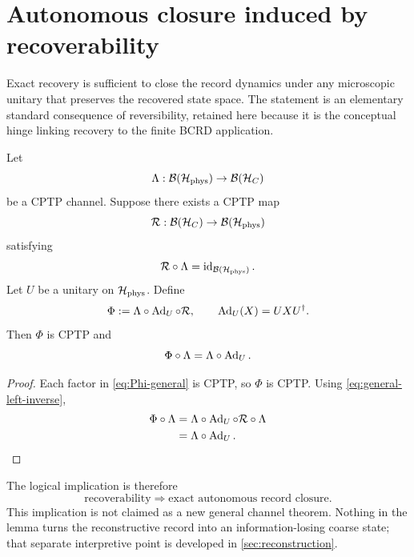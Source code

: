 \section{Autonomous closure induced by recoverability}
\label{sec:closure}

Exact recovery is sufficient to close the record dynamics under any microscopic unitary that preserves the recovered state space.  The statement is an elementary standard consequence of reversibility, retained here because it is the conceptual hinge linking recovery to the finite BCRD application.

\begin{lemma}
\label{lem:left-inverse-closure}
Let
\begin{equation}
  \Lambda:\mathcal B(\mathcal H_{\mathrm{phys}})\to\mathcal B(\mathcal H_C)
\end{equation}
be a CPTP channel.  Suppose there exists a CPTP map
\begin{equation}
  \mathcal R:\mathcal B(\mathcal H_C)\to\mathcal B(\mathcal H_{\mathrm{phys}})
\end{equation}
satisfying
\begin{equation}
  \mathcal R\circ\Lambda=\operatorname{id}_{\mathcal B(\mathcal H_{\mathrm{phys}})}.
  \label{eq:general-left-inverse}
\end{equation}
Let $U$ be a unitary on $\mathcal H_{\mathrm{phys}}$.  Define
\begin{equation}
  \Phi:=\Lambda\circ\operatorname{Ad}_U\circ\mathcal R,
  \qquad
  \operatorname{Ad}_U(X)=UXU^\dagger.
  \label{eq:Phi-general}
\end{equation}
Then $\Phi$ is CPTP and
\begin{equation}
  \Phi\circ\Lambda
  =\Lambda\circ\operatorname{Ad}_U.
  \label{eq:intertwining}
\end{equation}
\end{lemma}

\begin{proof}
Each factor in \cref{eq:Phi-general} is CPTP, so $\Phi$ is CPTP.  Using \cref{eq:general-left-inverse},
\begin{align}
  \Phi\circ\Lambda
  &=\Lambda\circ\operatorname{Ad}_U\circ\mathcal R\circ\Lambda\\
  &=\Lambda\circ\operatorname{Ad}_U.
\end{align}
\end{proof}

The logical implication is therefore
\begin{equation}
  \boxed{\text{recoverability}\Longrightarrow\text{exact autonomous record closure}.}
  \label{eq:recoverability-implies-closure}
\end{equation}
This implication is not claimed as a new general channel theorem.  Nothing in the lemma turns the reconstructive record into an information-losing coarse state; that separate interpretive point is developed in \cref{sec:reconstruction}.

